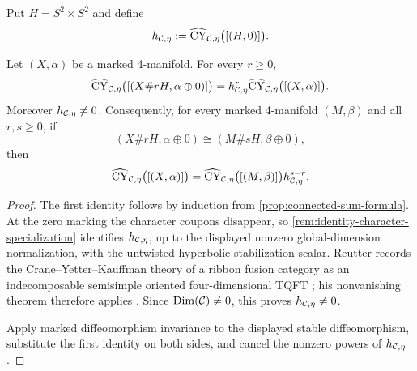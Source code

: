 \begin{definition}
\label{def:hyperbolic-stabilization-factor}
Put $H=S^2\times S^2$ and define
\[
  h_{\mathcal{C},\eta}:=
    \widehat{\operatorname{CY}}_{\mathcal{C},\eta}\bigl([(H,0)]\bigr).
\]
\end{definition}

\begin{proposition}
\label{prop:marked-stabilization-formula}
Let \((X,\alpha)\) be a marked 4-manifold.  For every $r\geq0$,
\[
  \widehat{\operatorname{CY}}_{\mathcal{C},\eta}
    \bigl([(X\#rH,\alpha\oplus0)]\bigr)
  =h_{\mathcal{C},\eta}^{r}
    \widehat{\operatorname{CY}}_{\mathcal{C},\eta}\bigl([(X,\alpha)]\bigr).
\]
Moreover $h_{\mathcal{C},\eta}\neq0$.  Consequently, for every marked 4-manifold
\((M,\beta)\) and all \(r,s\geq0\), if
\[
  (X\#rH,\alpha\oplus0)
  \cong(M\#sH,\beta\oplus0),
\]
then
\[
  \widehat{\operatorname{CY}}_{\mathcal{C},\eta}\bigl([(X,\alpha)]\bigr)
  =\widehat{\operatorname{CY}}_{\mathcal{C},\eta}\bigl([(M,\beta)]\bigr)
   h_{\mathcal{C},\eta}^{s-r}.
\]
\end{proposition}

\begin{proof}
The first identity follows by induction from
\cref{prop:connected-sum-formula}.  At the zero marking the character
coupons disappear, so \cref{rem:identity-character-specialization} identifies
$h_{\mathcal{C},\eta}$, up to the displayed nonzero global-dimension
normalization, with the untwisted hyperbolic stabilization scalar.  Reutter
records the Crane--Yetter--Kauffman theory of a ribbon fusion category as an
indecomposable semisimple oriented four-dimensional TQFT
\cite[Example~2.3]{Reutter2023}; his nonvanishing theorem therefore applies
\cite[Theorem~3.5]{Reutter2023}.  Since
$\operatorname{Dim}(\mathcal{C})\neq0$, this proves $h_{\mathcal{C},\eta}\neq0$.

Apply marked diffeomorphism invariance to
the displayed stable diffeomorphism, substitute the first identity on both
sides, and cancel the nonzero powers of $h_{\mathcal{C},\eta}$.
\end{proof}
